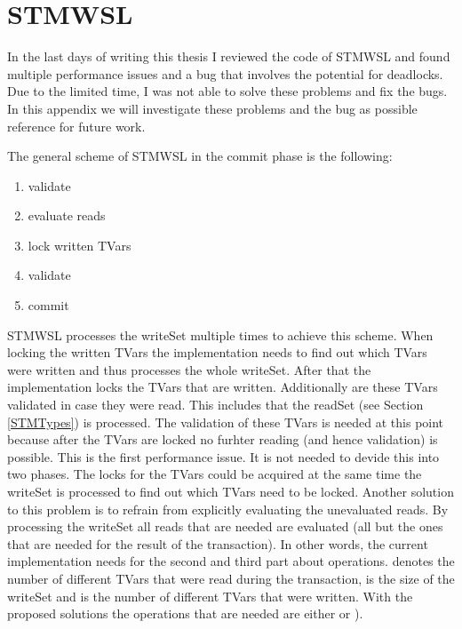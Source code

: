 
\chapter{STMWSL} 

\label{AppendixB} 

In the last days of writing this thesis I reviewed the code of STMWSL and found multiple performance
issues and a bug that involves the potential for deadlocks. Due to the limited time, I was not able to 
solve these problems and fix the bugs. In this appendix we will investigate these problems and the 
bug as possible reference for future work. 

The general scheme of STMWSL in the commit phase is the following:
\begin{enumerate}
 \item validate
 \item evaluate reads
 \item lock written TVars
 \item validate
 \item commit
\end{enumerate}
STMWSL processes the writeSet multiple times to achieve this scheme. When locking the written TVars the
implementation needs to find out which TVars were written and thus processes the whole writeSet. After 
that the implementation locks the TVars that are written. Additionally are these TVars validated in
case they were read. This includes that the readSet (see Section \ref{STMTypes}) is processed.
The validation of these TVars is needed at this point because after the TVars are locked no
furhter reading (and hence validation) is possible. This is the first performance issue.
It is not needed to devide this into two phases. The locks for the TVars could be acquired at the
same time the writeSet is processed to find out which TVars need to be locked. Another solution to
this problem is to refrain from explicitly evaluating the unevaluated reads. By processing the writeSet
all reads that are needed are evaluated (all but the ones that are needed for the result of the transaction).
In other words, the current implementation needs for the second and third part about 
operations.  denotes the number of different TVars that were read during the transaction, 
is the size of the writeSet and  is the number of different TVars that were written.
With the proposed solutions the operations that are needed are either  or 
). 

